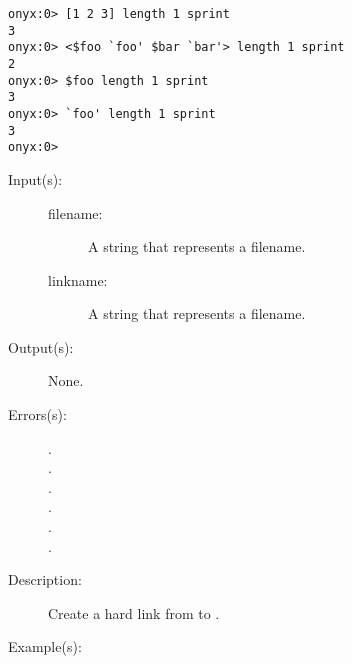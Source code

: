 \begin{description}
\begin{description}
\begin{verbatim}
onyx:0> [1 2 3] length 1 sprint
3
onyx:0> <$foo `foo' $bar `bar'> length 1 sprint
2
onyx:0> $foo length 1 sprint
3
onyx:0> `foo' length 1 sprint
3
onyx:0>
		\end{verbatim}
	\end{description}
\label{systemdict:link}
\item[{\onyxop{filename linkname}{link}{--}}: ]
	\begin{description}\item[]
	\item[Input(s): ]
		\begin{description}\item[]
		\item[filename: ]
			A string that represents a filename.
		\item[linkname: ]
			A string that represents a filename.
		\end{description}
	\item[Output(s): ] None.
	\item[Errors(s): ]
		\begin{description}\item[]
		\item[.]
		\item[.]
		\item[.]
		\item[.]
		\item[.]
		\item[.]
		\end{description}
	\item[Description: ]
		Create a hard link from  to .
	\item[Example(s): ]\begin{verbatim}


\end{verbatim}
\end{description}
\end{description}

